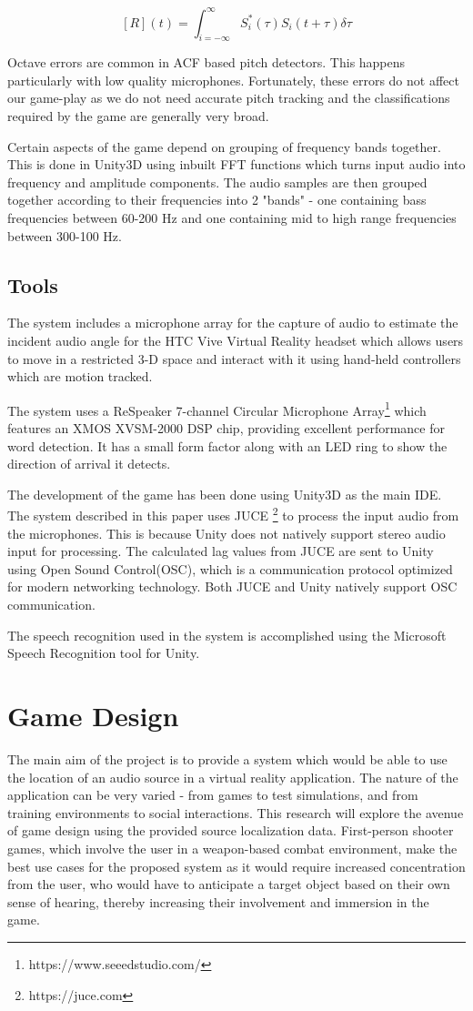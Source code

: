 \documentclass[convention]{aesconf}
\begin{document}
\[ [R] (t)  = \int_{i=-{\infty}}^{\infty} S_i^*(\tau) S_i(t+\tau) \delta \tau  \]

Octave errors are common in ACF based pitch detectors. This happens particularly with low quality microphones. Fortunately, these errors do not affect our game-play as we do not need accurate pitch tracking and the classifications required by the game are generally very broad.

Certain aspects of the game depend on grouping of frequency bands together. This is done in Unity3D using inbuilt FFT functions which turns input audio into frequency and amplitude components. The audio samples are then grouped together according to their frequencies into 2 "bands" - one containing bass frequencies between 60-200 Hz and one containing mid to high range frequencies between 300-100 Hz.

\subsection{Tools} 
The system includes a microphone array for the capture of audio to estimate the incident audio angle for the HTC Vive Virtual Reality headset which allows users to move in a restricted 3-D space and interact with it using hand-held controllers which are motion tracked. 

The system uses a ReSpeaker 7-channel Circular Microphone Array\footnote{https://www.seeedstudio.com/} which features an XMOS XVSM-2000 DSP chip, providing excellent performance for word detection. It has a small form factor along with an LED ring to show the direction of arrival it detects. 

The development of the game has been done using Unity3D as the main IDE. The system described in this paper uses JUCE \footnote{https://juce.com} to process the input audio from the microphones. This is because Unity does not natively support stereo audio input for processing. The calculated lag values from JUCE are sent to Unity using Open Sound Control(OSC), which is a communication protocol optimized for modern networking technology. Both JUCE and Unity natively support OSC communication.

The speech recognition used in the system is accomplished using the Microsoft Speech Recognition tool for Unity. 

\section{Game Design}
The main aim of the project is to provide a system which would be able to use the location of an audio source in a virtual reality application. The nature of the application can be very varied - from games to test simulations, and from training environments to social interactions. This research will explore the avenue of game design using the provided source localization data. 
First-person shooter games, which involve the user in a weapon-based combat environment, make the best use cases for the proposed system as it would require increased concentration from the user, who would have to anticipate a target object based on their own sense of hearing, thereby increasing their involvement and immersion in the game.
\end{document}
